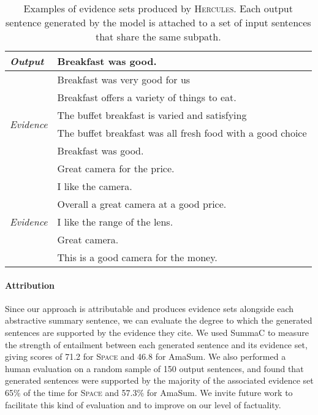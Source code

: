 \documentclass[11pt]{article}
\begin{document}
\begin{table}[t]
    \centering
    \small
    \begin{tabular}{@{}m{1.2cm}@{~}|@{~}m{5.8cm}@{}}
    \hline\hline
\textit{Output} & Breakfast was good. \\
\hline
\multirow{6}{*}{\textit{Evidence}} & Breakfast was very good for us \\
& Breakfast offers a variety of things to eat. \\
& The buffet breakfast is varied and satisfying \\
& The buffet breakfast was all fresh food with a good choice \\
& Breakfast was good. \\
\hline\hline
\textit{Output} & Great camera for the price. \\
\hline
\multirow{5}{*}{\textit{Evidence}} & I like the camera. \\
& Overall a great camera at a good price. \\
& I like the range of the lens. \\
& Great camera. \\
& This is a good camera for the money. \\
\hline\hline
    \end{tabular}
    \vspace{-.1cm}
    \caption{Examples of evidence sets produced by \textsc{Hercules}. Each output sentence generated by the model is attached to a set of input sentences that share the same subpath.}
    \vspace{-.2cm}
    \label{tab:evidence_sets}
\end{table}


\paragraph{Attribution}

Since our approach is attributable and produces evidence sets alongside each abstractive summary sentence, we can evaluate the degree to which the generated sentences are supported by the evidence they cite. We used SummaC to measure the strength of entailment between each generated sentence and its evidence set, giving scores of 71.2 for \textsc{Space} and 46.8 for AmaSum. 
We also performed a human evaluation on a random sample of 150 output sentences, and found that generated sentences were supported by the majority of the associated evidence set 65\% of the time for \textsc{Space} and 57.3\% for AmaSum. We invite future work to facilitate this kind of evaluation and to improve on our level of factuality.
\end{document}
